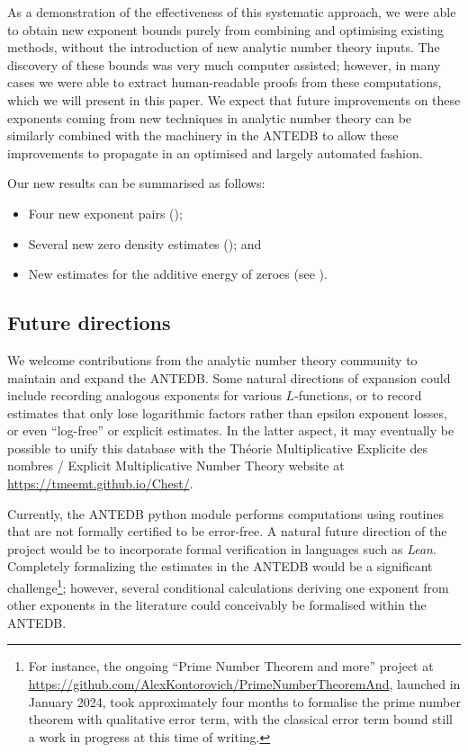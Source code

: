 \documentclass[a4paper, 10pt]{amsart}
\begin{document}
As a demonstration of the effectiveness of this systematic approach, we were able to obtain new exponent bounds purely from combining and optimising existing methods, without the introduction of new analytic number theory inputs.  The discovery of these bounds was very much computer assisted; however, in many cases we were able to extract human-readable proofs from these computations, which we will present in this paper.  We expect that future improvements on these exponents coming from new techniques in analytic number theory can be similarly combined with the machinery in the ANTEDB to allow these improvements to propagate in an optimised and largely automated fashion.

Our new results can be summarised as follows:
\begin{itemize}
\item Four new exponent pairs ();
\item Several new zero density estimates (); and
\item New estimates for the additive energy of zeroes (see ).
\end{itemize}
%
\subsection{Future directions}

We welcome contributions from the analytic number theory community to maintain and expand the ANTEDB.  Some natural directions of expansion could include recording analogous exponents for various $L$-functions, or to record estimates that only lose logarithmic factors rather than epsilon exponent losses, or even ``log-free'' or explicit estimates.  In the latter aspect, it may eventually be possible to unify this database with the Th\'eorie Multiplicative Explicite des nombres / Explicit Multiplicative Number Theory website at \url{https://tmeemt.github.io/Chest/}.

Currently, the ANTEDB python module performs computations using routines that are not formally certified to be error-free.  A natural future direction of the project would be to incorporate formal verification in languages such as \emph{Lean}.  Completely formalizing the estimates in the ANTEDB would be a significant challenge\footnote{For instance, the ongoing ``Prime Number Theorem and more'' project at \url{https://github.com/AlexKontorovich/PrimeNumberTheoremAnd}, launched in January 2024, took approximately four months to formalise the prime number theorem with qualitative error term, with the classical error term bound still a work in progress at this time of writing.}; however, several conditional calculations deriving one exponent from other exponents in the literature could conceivably be formalised within the ANTEDB.
\end{document}
